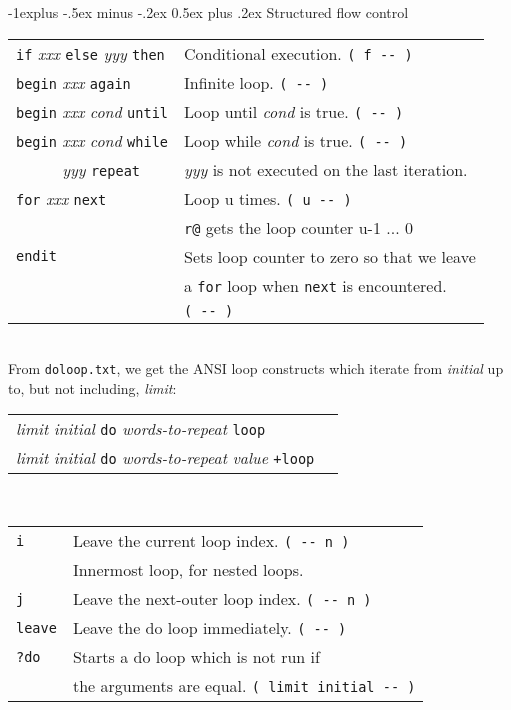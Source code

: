 \documentclass[10pt,landscape,a4paper]{article}
\makeatletter
\renewcommand{\subsection}{\@startsection{subsection}{2}{0mm}%
                                {-1explus -.5ex minus -.2ex}%
                                {0.5ex plus .2ex}%
                                {\normalfont\normalsize\bfseries}}
\newcommand{\compileonly}{\color{blue}}
\makeatother
\begin{document}
\begin{multicols}{3}
\subsection{Structured flow control}
\begin{tabular}{@{}ll@{}}
{\compileonly\verb!if!} \textit{xxx} {\compileonly\verb!else!} \textit{yyy} {\compileonly\verb!then!} & Conditional execution. \verb!( f -- )! \\
{\compileonly\verb!begin!} \textit{xxx} {\compileonly\verb!again!} & Infinite loop. \verb!( -- )! \\
{\compileonly\verb!begin!} \textit{xxx} \textit{cond} {\compileonly\verb!until!} & Loop until \textit{cond} is true. \verb!( -- )! \\
{\compileonly\verb!begin!} \textit{xxx} \textit{cond} {\compileonly\verb!while!}  &  Loop while \textit{cond} is true. \verb!( -- )! \\
\verb!     ! \textit{yyy} {\compileonly\verb!repeat!}               & \textit{yyy} is not executed on the last iteration. \\
{\compileonly\verb!for!} \textit{xxx} {\compileonly\verb!next!}  & Loop u times. \verb!( u -- )! \\
                                     & {\compileonly\verb!r@!} gets the loop counter  u-1 ... 0 \\
{\compileonly\verb!endit!}  & Sets loop counter to zero so that we leave \\
              & a {\compileonly\verb!for!} loop when {\compileonly\verb!next!} is encountered. \\
              & \verb!( -- )! \\
\end{tabular}\\
From \verb!doloop.txt!, we get the ANSI loop constructs which iterate from \textit{initial}
up to, but not including, \textit{limit}:\\
\begin{tabular}{@{}ll@{}}
\textit{limit} \textit{initial} {\compileonly\verb!do!} \textit{words-to-repeat} {\compileonly\verb!loop!} & \\
\textit{limit} \textit{initial} {\compileonly\verb!do!} \textit{words-to-repeat} \textit{value} {\compileonly\verb!+loop!} & \\
\end{tabular}\\ 
\begin{tabular}{@{}ll@{}}
{\compileonly\verb!i!} & Leave the current loop index. \verb!( -- n )! \\
         & Innermost loop, for nested loops. \\
{\compileonly\verb!j!} & Leave the next-outer loop index. \verb!( -- n )! \\
{\compileonly\verb!leave!} & Leave the do loop immediately. \verb!( -- )! \\
{\compileonly\verb!?do!} & Starts a do loop which is not run if \\
                         & the arguments are equal. \verb!( limit initial -- )! \\
\end{tabular}\\ 


\end{multicols}
\end{document}
